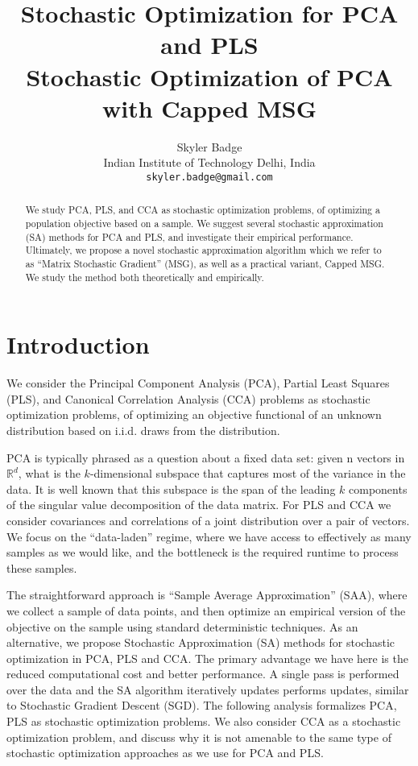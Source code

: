 \documentclass{article}
\title{Stochastic Optimization for PCA and PLS \\
Stochastic Optimization of PCA with Capped MSG}
\author{
  Skyler Badge \\
  Indian Institute of Technology Delhi, India\\
  \texttt{skyler.badge@gmail.com} \\
}
\begin{document}
\maketitle

\begin{abstract}
We study PCA, PLS, and CCA as stochastic optimization problems, of optimizing a population objective based on a sample. We suggest several stochastic approximation (SA) methods for PCA and PLS, and investigate their empirical performance. Ultimately, we propose a novel stochastic approximation algorithm which we refer to as “Matrix Stochastic Gradient” (MSG), as well as a practical variant, Capped MSG. We study the method both theoretically and empirically.
\end{abstract}




\section{Introduction}
We consider the Principal Component Analysis (PCA), Partial Least Squares (PLS), and Canonical Correlation Analysis (CCA) problems as stochastic optimization problems, of optimizing an objective functional of an unknown distribution based on i.i.d. draws from the distribution.

PCA is typically phrased as a question about a fixed data set: given n vectors in $\mathbb{R}^{d}$, what is the $k$-dimensional subspace that captures most of the variance in the data. It is well known that this subspace is the span of the leading $k$ components of the singular value decomposition of the data matrix. For PLS and CCA we consider covariances and correlations of a joint distribution over a pair of vectors. We focus on the “data-laden” regime, where we have access to effectively as many samples as we would like, and the bottleneck is the required runtime to process these samples.

The straightforward approach is “Sample Average Approximation” (SAA), where we collect a sample of data points, and then optimize an empirical version of the objective on the sample using standard deterministic techniques. As an alternative, we propose Stochastic Approximation (SA) methods for stochastic optimization in PCA, PLS and CCA. The primary advantage we have here is the reduced computational cost and better performance. A single pass is performed over the data and the SA algorithm iteratively updates performs updates, similar to Stochastic Gradient Descent (SGD). The following analysis formalizes PCA, PLS as stochastic optimization problems. We also consider CCA as a stochastic optimization problem, and discuss why it is not amenable to the same type of stochastic optimization approaches as we use for PCA and PLS.
\end{document}

